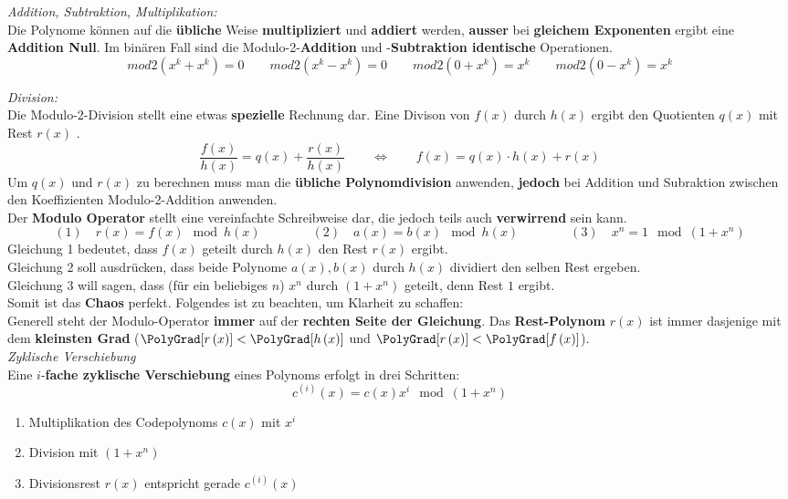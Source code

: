 \textit{Addition, Subtraktion, Multiplikation:} \\
Die Polynome können auf die \textbf{übliche} Weise \textbf{multipliziert} und \textbf{addiert} werden,
\textbf{ausser} bei \textbf{gleichem Exponenten} ergibt eine \textbf{Addition Null}.
Im binären Fall sind die Modulo-2-\textbf{Addition} und
-\textbf{Subtraktion identische} Operationen. 
$$ mod2(x^k + x^k) = 0 \qquad mod2(x^k - x^k) = 0 \qquad mod2(0 + x^k) = x^k \qquad mod2(0 - x^k) = x^k$$

\textit{Division:}\\
Die Modulo-2-Division stellt eine etwas \textbf{spezielle} Rechnung dar.
Eine Divison von \boldmath$f(x)$ durch $h(x)$ ergibt den Quotienten $q(x)$ mit Rest $r(x)$
\unboldmath . 
$$ \dfrac{f(x)}{h(x)} = q(x) + \dfrac{r(x)}{h(x)} \qquad \Longleftrightarrow \qquad \boxed{f(x) = q(x)
\cdot h(x) + r(x)}$$ 
Um $q(x)$ und $r(x)$ zu berechnen muss man die \textbf{übliche Polynomdivision} anwenden, \textbf{jedoch}
bei Addition und Subraktion zwischen den Koeffizienten Modulo-2-Addition anwenden. \\ 
Der \textbf{Modulo Operator} stellt eine vereinfachte Schreibweise dar, die jedoch teils auch
\textbf{verwirrend} sein kann.
$$ (1) \quad r(x) = f(x) \mod{h(x)} \qquad \qquad 
(2) \quad a(x) = b(x) \mod{h(x)} \qquad \qquad 
(3) \quad x^n = 1 \mod{(1 + x^n)}$$
Gleichung 1 bedeutet, dass $f(x)$ geteilt durch $h(x)$ den Rest $r(x)$ ergibt. \\
Gleichung 2 soll ausdrücken, dass beide Polynome $a(x), b(x)$ durch $h(x)$ dividiert den selben
Rest ergeben. \\
Gleichung 3 will sagen, dass (für ein beliebiges $n$) $x^n$ durch $(1 + x^n)$ geteilt, denn Rest
$1$ ergibt. \\
Somit ist das \textbf{Chaos} perfekt. Folgendes ist zu beachten, um Klarheit zu schaffen:\\
Generell steht der Modulo-Operator \textbf{immer} auf der \textbf{rechten Seite der Gleichung}. 
Das \textbf{Rest-Polynom} $r(x)$ ist immer dasjenige mit dem \textbf{kleinsten Grad
}($\PolyGrad[r \left( x \right)] < \PolyGrad[h \left(x \right)]$ und
$\PolyGrad[r \left(x \right) ] < \PolyGrad[f \left( x \right)]$).
\\

\textit{Zyklische Verschiebung} \\
Eine $i$-\textbf{fache zyklische Verschiebung} eines Polynoms erfolgt in drei Schritten:
$$ c^{(i)}(x) = c(x) x^i \mod{(1+x^n)}$$
\begin{enumerate}
  \item Multiplikation des Codepolynoms $c(x)$ mit $x^i$
  \item Division mit $(1+x^n)$
  \item Divisionsrest $r(x)$ entspricht gerade $c^{(i)}(x)$
\end{enumerate}

